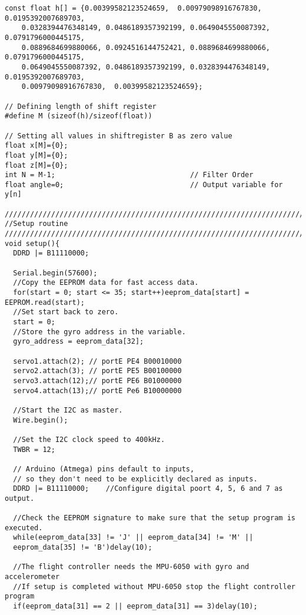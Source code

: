 \begin{lstlisting}
const float h[] = {0.00399582123524659,  0.00979098916767830,  0.0195392007689703, 
    0.0328394476348149, 0.0486189357392199, 0.0649045550087392, 0.0791796000445175, 
    0.0889684699880066, 0.0924516144752421, 0.0889684699880066, 0.0791796000445175, 
    0.0649045550087392, 0.0486189357392199, 0.0328394476348149, 0.0195392007689703, 
    0.00979098916767830,  0.00399582123524659};

// Defining length of shift register
#define M (sizeof(h)/sizeof(float))  

// Setting all values in shiftregister B as zero value
float x[M]={0};                             
float y[M]={0};
float z[M]={0};
int N = M-1;                                // Filter Order
float angle=0;                              // Output variable for y[n]

////////////////////////////////////////////////////////////////////////////////////////
//Setup routine
////////////////////////////////////////////////////////////////////////////////////////
void setup(){
  DDRD |= B11110000;

  Serial.begin(57600);
  //Copy the EEPROM data for fast access data.
  for(start = 0; start <= 35; start++)eeprom_data[start] = EEPROM.read(start);
  //Set start back to zero.
  start = 0;
  //Store the gyro address in the variable.                                                                
  gyro_address = eeprom_data[32];                                           

  servo1.attach(2); // portE PE4 B00010000
  servo2.attach(3); // portE PE5 B00100000
  servo3.attach(12);// portE PE6 B01000000
  servo4.attach(13);// portE Pe6 B10000000

  //Start the I2C as master.
  Wire.begin();                                                             

  //Set the I2C clock speed to 400kHz.
  TWBR = 12;                                                                

  // Arduino (Atmega) pins default to inputs, 
  // so they don't need to be explicitly declared as inputs.
  DDRD |= B11110000;    //Configure digital poort 4, 5, 6 and 7 as output.

  //Check the EEPROM signature to make sure that the setup program is executed.
  while(eeprom_data[33] != 'J' || eeprom_data[34] != 'M' || 
  eeprom_data[35] != 'B')delay(10);

  //The flight controller needs the MPU-6050 with gyro and accelerometer
  //If setup is completed without MPU-6050 stop the flight controller program  
  if(eeprom_data[31] == 2 || eeprom_data[31] == 3)delay(10);


\end{lstlisting}
